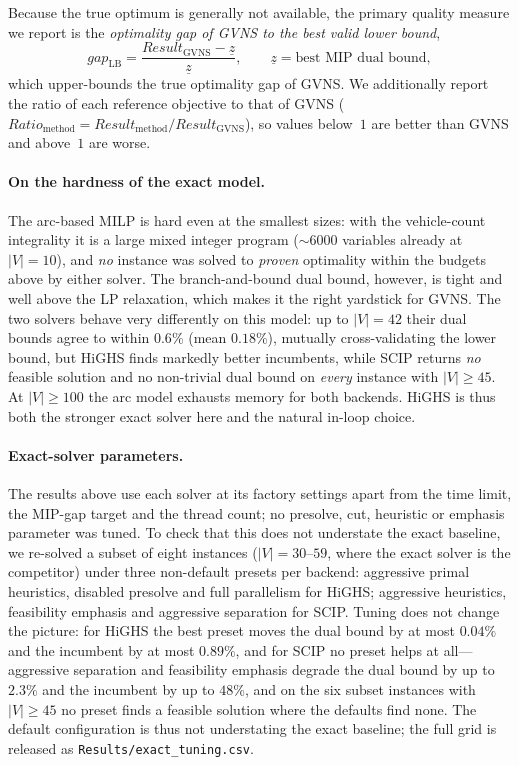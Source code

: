 \documentclass[runningheads]{llncs}
\begin{document}
Because the true optimum is generally not available, the primary quality
measure we report is the \emph{optimality gap of GVNS to the best valid lower
bound},
\[
  gap_{\mathrm{LB}}=\frac{Result_{\text{GVNS}}-\underline{z}}{\underline{z}},
  \qquad
  \underline{z}=\text{best MIP dual bound},
\]
which upper-bounds the true optimality gap of GVNS. We additionally report the
ratio of each reference objective to that of GVNS
($Ratio_{\text{method}}=Result_{\text{method}}/Result_{\text{GVNS}}$), so values
below~$1$ are better than GVNS and above~$1$ are worse.

\paragraph{On the hardness of the exact model.} The arc-based MILP is hard even
at the smallest sizes: with the vehicle-count integrality it is a large mixed
integer program ($\sim\!6000$ variables already at $|V|=10$), and \emph{no}
instance was solved to \emph{proven} optimality within the budgets above by either
solver. The branch-and-bound dual bound, however, is tight and well above the LP
relaxation, which makes it the right yardstick for GVNS. The two solvers behave
very differently on this model: up to $|V|=42$ their dual bounds agree to within
$0.6\%$ (mean $0.18\%$), mutually cross-validating the lower bound, but HiGHS
finds markedly better incumbents, while SCIP returns \emph{no} feasible solution
and no non-trivial dual bound on \emph{every} instance with $|V|\ge45$. At
$|V|\ge100$ the arc model exhausts memory for both backends. HiGHS is thus both
the stronger exact solver here and the natural in-loop choice.

\paragraph{Exact-solver parameters.} The results above use each solver at its
factory settings apart from the time limit, the MIP-gap target and the thread
count; no presolve, cut, heuristic or emphasis parameter was tuned. To check that
this does not understate the exact baseline, we re-solved a subset of eight
instances ($|V|=30$--$59$, where the exact solver is the competitor) under three
non-default presets per backend: aggressive primal heuristics, disabled presolve
and full parallelism for HiGHS; aggressive heuristics, feasibility emphasis and
aggressive separation for SCIP. Tuning does not change the picture: for HiGHS the
best preset moves the dual bound by at most $0.04\%$ and the incumbent by at most
$0.89\%$, and for SCIP no preset helps at all---aggressive separation and
feasibility emphasis degrade the dual bound by up to $2.3\%$ and the incumbent by
up to $48\%$, and on the six subset instances with $|V|\ge45$ no preset finds a
feasible solution where the defaults find none. The default configuration is thus
not understating the exact baseline; the full grid is released as
\texttt{Results/exact\_tuning.csv}.
\end{document}
